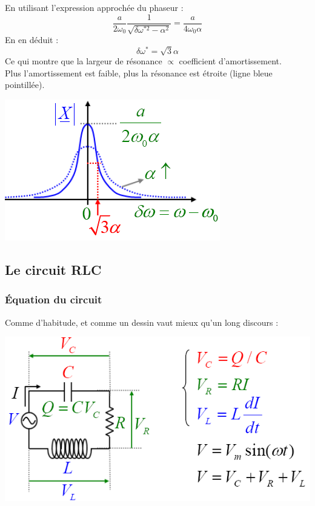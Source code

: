 \documentclass	[11pt, a4paper, openany]{book}
\begin{document}
En utilisant l'expression approchée du phaseur :
\begin{equation}
\frac{a}{2\omega_0}\frac{1}{\sqrt{\delta\omega^{*2} - \alpha^2}} = \frac{a}{4\omega_0\alpha}
\end{equation}
En en déduit :
\begin{equation}
\delta\omega^* = \sqrt{3}\alpha
\end{equation}
Ce qui montre que la largeur de résonance $\propto$ coefficient d'amortissement.\\
Plus l'amortissement est faible, plus la résonance est étroite (ligne bleue pointillée).
\begin{center}
\includegraphics[scale=0.5]{oo/image18.png}
\end{center}
\subsection{Le circuit RLC}
\subsubsection{Équation du circuit}
Comme d'habitude, et comme un dessin vaut mieux qu'un long discours :
\begin{center}
\includegraphics[scale=0.5]{oo/image19.png}
\end{center}
\end{document}

